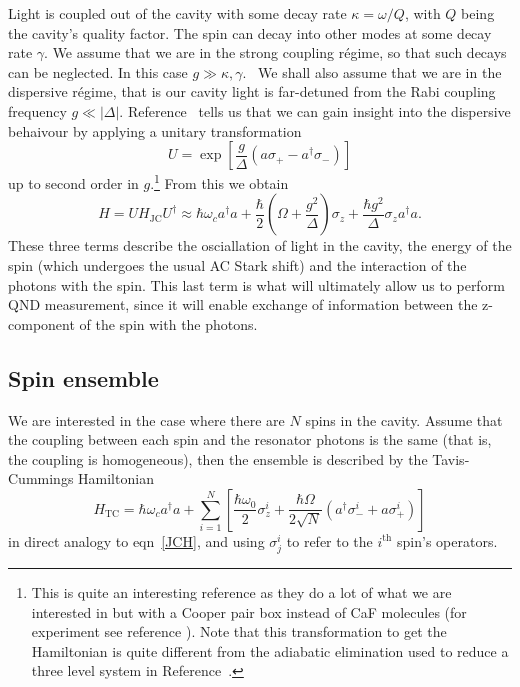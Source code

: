 \documentclass{article}
\begin{document}
Light is coupled out of the cavity with some decay rate $\kappa = \omega/Q$,
with $Q$ being the cavity's quality factor. The spin can decay into other modes
at some decay rate $\gamma$. We assume that we are in the strong coupling
r\'egime, so that such decays can be neglected. In this case $g \gg \kappa,
\gamma$.~\cite{PhysRevA.69.062320} We shall also assume that we are in the
dispersive r\'egime, that is our cavity light is far-detuned from the Rabi
coupling frequency $g\ll|\Delta|$. Reference~\cite{PhysRevA.69.062320} tells us
that we can gain insight into the dispersive behaivour by applying  a unitary
transformation
%
\begin{equation} U = \exp \left[\frac{g}{\Delta}(a\sigma_+ -
a^\dagger\sigma_-)\right] \end{equation}
%
up to second order in $g$.\footnote{This is quite an interesting reference as
they do a lot of what we are interested in but with a Cooper pair box instead
of CaF molecules (for experiment see reference \cite{Wallraff2004}). Note that
this transformation to get the Hamiltonian is quite different from the
adiabatic elimination used to reduce a three level system in
Reference~\cite{SchleierSmith2011}.} From this we obtain
%
\begin{equation} H= UH_\text{JC}U^\dagger \approx \hbar \omega_c
  a^\dagger a + \frac{\hbar}{2}\left(\Omega +
  \frac{g^2}{\Delta}\right)\sigma_z + \frac{\hbar
  g^2}{\Delta}\sigma_z a^\dagger a.  \end{equation}
%
These three terms describe the osciallation of light in the cavity, the energy
of the spin (which undergoes the usual AC Stark shift) and the interaction of
the photons with the spin. This last term is what will ultimately allow us to
perform QND measurement, since it will enable exchange of information between
the z-component of the spin with the photons.

\subsection{Spin ensemble}

We are interested in the case where there are $N$ spins in the
cavity. Assume that the coupling between each spin and the resonator photons is
the same (that is, the coupling is homogeneous), then the ensemble is described
by the Tavis-Cummings Hamiltonian~\cite{}
%
\begin{equation}
  H_\text{TC}=  \hbar \omega_c a^\dagger a + \sum_{i=1}^N\left[
    \frac{\hbar\omega_0}{2}\sigma_z^i +\frac{\hbar\Omega}{2\sqrt{N}}(a^\dagger
    \sigma^i_- + a\sigma^i_+)\right]
\end{equation}
%
in direct analogy to eqn~\ref{JCH}, and using $\sigma_j^i$ to refer to the
$i^\text{th}$ spin's operators.
\end{document}
